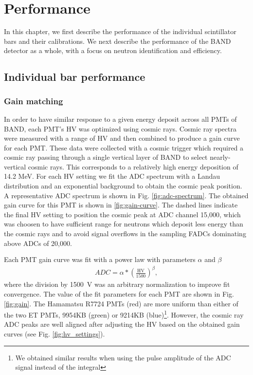 \documentclass[3p,final,twocolumn]{elsarticle}
\begin{document}
\section{Performance}
In this chapter, we first describe the performance of the individual scintillator bars and their calibrations. We next describe the performance
of the BAND detector as a whole, with a focus on neutron identification and efficiency.

\subsection{Individual bar performance}
\subsubsection{Gain matching}
In order to have similar response to a given energy deposit across all PMTs of BAND, each PMT's HV was optimized using cosmic rays. Cosmic
ray spectra were measured with a range of HV and then combined to produce a gain curve for each PMT. These data were
collected with a cosmic trigger which required a cosmic ray passing through a single vertical layer of BAND to select nearly-vertical
cosmic rays. This corresponds to a relatively high energy deposition of 14.2 \si{\mega\eV}. For each HV setting we fit the ADC spectrum
with a Landau distribution and an exponential background to obtain the cosmic peak position. A representative ADC spectrum is shown in
Fig. \ref{fig:adc-spectrum}.  The obtained gain curve for this PMT is shown in \ref{fig:gain-curve}. The dashed lines indicate the final HV
setting to position the cosmic peak at ADC channel 15,000, which was choosen to have sufficient range for neutrons which deposit less
energy than the cosmic rays and to avoid signal overflows in the sampling FADCs dominating above ADCs of 20,000.

Each PMT gain curve was fit with a power law with parameters $\alpha$ and $\beta$
\begin{eqnarray}
	ADC	= \alpha * \left(\frac{\mathrm{HV}}{1500}\right)^{\beta},				
		\label{eqn:gain_curve}
\end{eqnarray}
where the division by 1500~\si{\volt} was an arbitrary normalization to improve fit convergence. The value of the fit parameters for each PMT are
shown in Fig. \ref{fig:gain}. The Hamamatsu R7724 PMTs (red) are more uniform than either of the two ET PMTs, 9954KB (green) or
9214KB (blue)\footnote{We obtained similar results when using the pulse amplitude of the ADC signal instead of the integral}. 
However, the cosmic ray ADC peaks are well aligned after adjusting the HV based on the obtained gain curves (see Fig. \ref{fig:hv_settings}).
\end{document}
